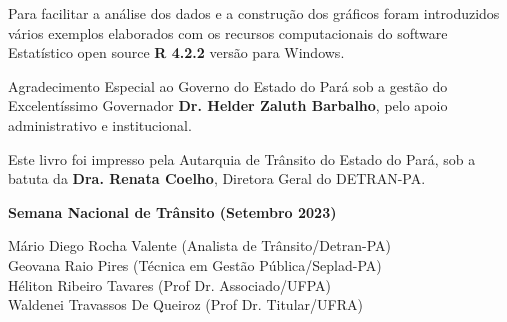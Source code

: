 Para facilitar a análise dos dados e a construção dos gráficos foram introduzidos vários exemplos elaborados com os recursos computacionais do software Estatístico open source \textbf{R 4.2.2} versão para Windows. 
\vst

Agradecimento Especial ao Governo do Estado do Pará sob a gestão do Excelentíssimo Governador \textbf{Dr. Helder Zaluth Barbalho}, pelo apoio administrativo e institucional.
\vst


Este livro foi impresso pela Autarquia de Trânsito do Estado do Pará, sob a batuta da \textbf{Dra. Renata Coelho}, Diretora Geral do DETRAN-PA.




\vst
\vst
\vst

\begin{centering}

\vst

\textbf{Semana Nacional de Trânsito (Setembro 2023)} 
\vsm

Mário Diego Rocha Valente (Analista de Trânsito/Detran-PA) \\
Geovana Raio Pires (Técnica em Gestão Pública/Seplad-PA)\\
Héliton Ribeiro Tavares (Prof Dr. Associado/UFPA)\\
Waldenei Travassos De Queiroz (Prof Dr. Titular/UFRA)\\



\end{centering}
